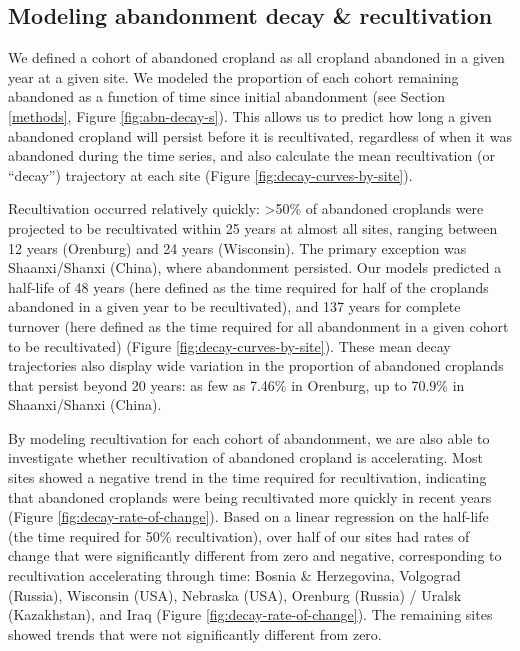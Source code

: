\documentclass[9pt,twocolumn,twoside,]{pnas-new}
\begin{document}
\hypertarget{modeling-abandonment-decay-recultivation}{%
\subsection{Modeling abandonment decay \&
recultivation}\label{modeling-abandonment-decay-recultivation}}

We defined a cohort of abandoned cropland as all cropland abandoned in a
given year at a given site. We modeled the proportion of each cohort
remaining abandoned as a function of time since initial abandonment (see
Section \ref{methods}, Figure \ref{fig:abn-decay-s}). This allows us to
predict how long a given abandoned cropland will persist before it is
recultivated, regardless of when it was abandoned during the time
series, and also calculate the mean recultivation (or ``decay'')
trajectory at each site (Figure \ref{fig:decay-curves-by-site}).

Recultivation occurred relatively quickly: \textgreater50\% of abandoned
croplands were projected to be recultivated within 25 years at almost
all sites, ranging between 12 years (Orenburg) and 24 years (Wisconsin).
The primary exception was Shaanxi/Shanxi (China), where abandonment
persisted. Our models predicted a half-life of 48 years (here defined as
the time required for half of the croplands abandoned in a given year to
be recultivated), and 137 years for complete turnover (here defined as
the time required for all abandonment in a given cohort to be
recultivated) (Figure \ref{fig:decay-curves-by-site}). These mean decay
trajectories also display wide variation in the proportion of abandoned
croplands that persist beyond 20 years: as few as 7.46\% in Orenburg, up
to 70.9\% in Shaanxi/Shanxi (China).


By modeling recultivation for each cohort of abandonment, we are also
able to investigate whether recultivation of abandoned cropland is
accelerating. Most sites showed a negative trend in the time required
for recultivation, indicating that abandoned croplands were being
recultivated more quickly in recent years (Figure
\ref{fig:decay-rate-of-change}). Based on a linear regression on the
half-life (the time required for 50\% recultivation), over half of our
sites had rates of change that were significantly different from zero
and negative, corresponding to recultivation accelerating through time:
Bosnia \& Herzegovina, Volgograd (Russia), Wisconsin (USA), Nebraska
(USA), Orenburg (Russia) / Uralsk (Kazakhstan), and Iraq (Figure
\ref{fig:decay-rate-of-change}). The remaining sites showed trends that
were not significantly different from zero.
\end{document}
